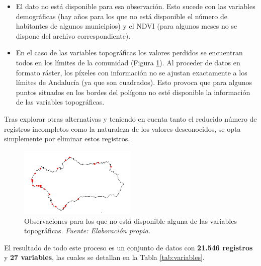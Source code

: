 \documentclass[12pt,a4paper,]{book}
\numberwithin{dummy}{section}
\theoremstyle{ocrenumbox}
\theoremstyle{blacknumex}
\theoremstyle{blacknumbox}
\theoremstyle{ocrenum}
\theoremstyle{ocrenum}
\begin{document}
\begin{itemize}
\item
  El dato no está disponible para esa observación. Esto sucede con las
  variables demográficas (hay años para los que no está disponible el
  número de habitantes de algunos municipios) y el NDVI (para algunos
  meses no se dispone del archivo correspondiente).
\item
  En el caso de las variables topográficas los valores perdidos se
  encuentran todos en los límites de la comunidad (Figura
  \ref{fig:nas_topograficas}). Al proceder de datos en formato ráster,
  los píxeles con información no se ajustan exactamente a los límites de
  Andalucía (ya que son cuadrados). Esto provoca que para algunos puntos
  situados en los bordes del polígono no esté disponible la información
  de las variables topográficas.
\end{itemize}

Tras explorar otras alternativas y teniendo en cuenta tanto el reducido
número de registros incompletos como la naturaleza de los valores
desconocidos, se opta simplemente por eliminar estos registros.

\begin{figure}[htb]
\centering
\includegraphics[width=0.5\textwidth]{graficos/nas_topograficas.png}
\caption[Observaciones para los que no está disponible alguna de las variables topográficas]{Observaciones para los que no está disponible alguna de las variables topográficas. \it Fuente: Elaboración propia.}
\label{fig:nas_topograficas}
\end{figure}

El resultado de todo este proceso es un conjunto de datos con
\textbf{21.546 registros} y \textbf{27 variables}, las cuales se
detallan en la Tabla \ref{tab:variables}.
\end{document}

